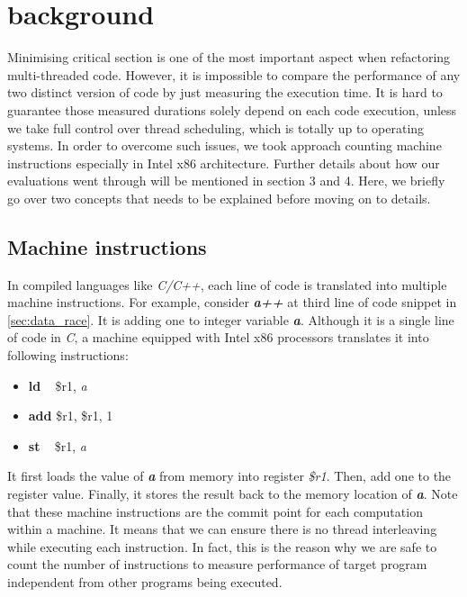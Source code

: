 \section{background}
\label{sec:background}

Minimising critical section is one of the most important aspect when refactoring multi-threaded code. However, it is impossible to compare the performance of any two distinct version of code by just measuring the execution time. It is hard to guarantee those measured durations solely depend on each code execution, unless we take full control over thread scheduling, which is totally up to operating systems. In order to overcome such issues, we took approach counting machine instructions especially in Intel x86 architecture. Further details about how our evaluations went through will be mentioned in section 3 and 4. Here, we briefly go over two concepts that needs to be explained before moving on to details.



\subsection{Machine instructions}
In compiled languages like \textit{C/C++}, each line of code is translated into multiple machine instructions. For example, consider \textbf{\textit{a++}} at third line of code snippet in \ref{sec:data_race}. It is adding one to integer variable \textbf{\textit{a}}. Although it is a single line of code in \textit{C}, a machine equipped with Intel x86 processors translates it into following instructions:
\begin{itemize}
	\item[] \textbf{ld} \,\,\, \$r1, \textit{a}
	\item[] \textbf{add} \$r1, \$r1, 1
	\item[] \textbf{st} \,\,\, \$r1, \textit{a}
\end{itemize}

It first loads the value of \textbf{\textit{a}} from memory into register \textit{\$r1}. Then, add one to the register value. Finally, it stores the result back to the memory location of \textbf{\textit{a}}. Note that these machine instructions are the commit point for each computation within a machine. It means that we can ensure there is no thread interleaving while executing each instruction. In fact, this is the reason why we are safe to count the number of instructions to measure performance of target program independent from other programs being executed.